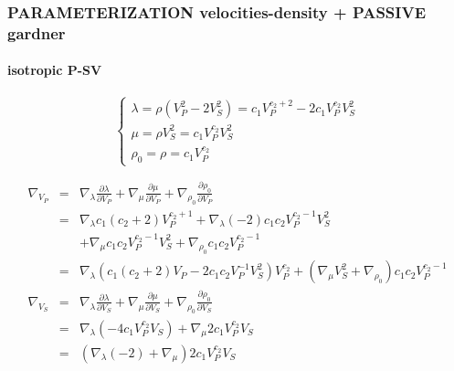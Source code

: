 \documentclass[9pt]{beamer}
\newcommand{\partderi}[2]{\frac{\partial#1}{\partial#2}}
\begin{document}
\begin{frame}\frametitle{PARAMETERIZATION velocities-density  + PASSIVE gardner}
\framesubtitle{isotropic P-SV}

  \begin{center}
  \end{center}
  
  \begin{minipage}{\linewidth}
    \[\left\{ \begin{array}{l}
      \lambda = \rho (V_P^2-2V_S^2) = c_1 V_P^{c_2+2} - 2c_1 V_P^{c_2} V_S^2 \\
      \mu    = \rho V_S^2 = c_1 V_P ^{c_2}V_S^2 \\
      \rho_0 = \rho = c_1 V_P ^{c_2}
    \end{array} \right.\]
    
    \begin{eqnarray}
      \nabla_{V_P} &=& \nabla_\lambda \partderi{\lambda}{V_P} + \nabla_\mu \partderi{\mu}{V_P} + \nabla_{\rho_0} \partderi{\rho_0}{V_P} \nonumber\\
                   &=& \nabla_\lambda c_1(c_2+2)V_P^{c_2+1}  + \nabla_\lambda (-2)c_1c_2V_P^{c_2-1}V_S^2 \nonumber\\
                   & &+\nabla_\mu     c_1c_2V_P^{c_2-1}V_S^2 + \nabla_{\rho_0} c_1c_2V_P^{c_2-1} \nonumber\\
                   &=& \nabla_\lambda \left(c_1(c_2+2)V_P -2c_1c_2V_P^{-1}V_S^2\right)V_P^{c_2} + \left(\nabla_\mu V_S^2 + \nabla_{\rho_0} \right)c_1c_2V_P^{c_2-1} \nonumber\\
      \nabla_{V_S} &=& \nabla_\lambda \partderi{\lambda}{V_S} + \nabla_\mu \partderi{\mu}{V_S} + \nabla_{\rho_0} \partderi{\rho_0}{V_S} \nonumber\\
                   &=& \nabla_\lambda (-4c_1 V_P^{c_2}V_S) + \nabla_\mu 2c_1V_P^{c_2}V_S \nonumber\\
                   &=& \left(\nabla_\lambda (-2) + \nabla_\mu \right)2c_1V_P^{c_2}V_S \nonumber
    \end{eqnarray}


\end{minipage}
\end{frame}
\end{document}
